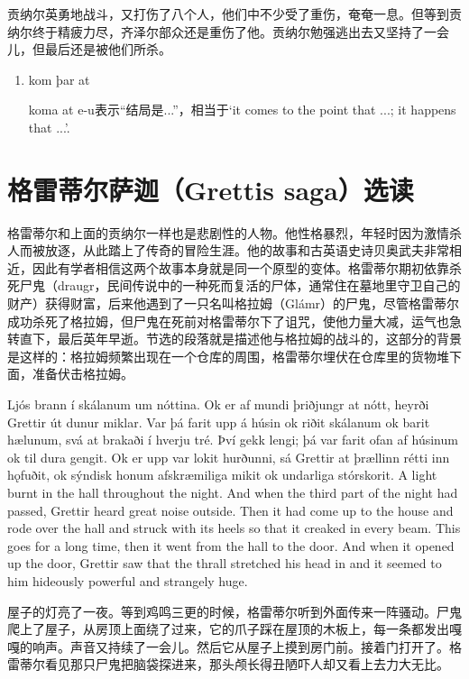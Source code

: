 \begin{translation*}{}
  贡纳尔英勇地战斗，又打伤了八个人，他们中不少受了重伤，奄奄一息。但等到贡纳尔终于精疲力尽，齐泽尔部众还是重伤了他。贡纳尔勉强逃出去又坚持了一会儿，但最后还是被他们所杀。
\end{translation*}
\begin{grammar*}{}
  \begin{enumerate}[leftmargin=*]
    \item kom þar at

          koma at e-u表示“结局是...”，相当于`it comes to the point that ...; it happens that ...'.
  \end{enumerate}
\end{grammar*}
\section{格雷蒂尔萨迦（Grettis saga）选读}
格雷蒂尔和上面的贡纳尔一样也是悲剧性的人物。他性格暴烈，年轻时因为激情杀人而被放逐，从此踏上了传奇的冒险生涯。他的故事和古英语史诗贝奥武夫非常相近，因此有学者相信这两个故事本身就是同一个原型的变体。格雷蒂尔期初依靠杀死尸鬼（draugr，民间传说中的一种死而复活的尸体，通常住在墓地里守卫自己的财产）获得财富，后来他遇到了一只名叫格拉姆（Glámr）的尸鬼，尽管格雷蒂尔成功杀死了格拉姆，但尸鬼在死前对格雷蒂尔下了诅咒，使他力量大减，运气也急转直下，最后英年早逝。节选的段落就是描述他与格拉姆的战斗的，这部分的背景是这样的：格拉姆频繁出现在一个仓库的周围，格雷蒂尔埋伏在仓库里的货物堆下面，准备伏击格拉姆。
\begin{paracol}{2}
  Ljós brann í skálanum um nóttina. Ok er af mundi þriðjungr at nótt, heyrði Grettir út dunur miklar. Var þá farit upp á húsin ok riðit skálanum ok barit hælunum, svá at brakaði í hverju tré. Því gekk lengi; þá var farit ofan af húsinum ok til dura gengit. Ok er upp var lokit hurðunni, sá Grettir at þrællinn rétti inn hǫfuðit, ok sýndisk honum afskræmiliga mikit ok undarliga stórskorit.
  \switchcolumn
  A light burnt in the hall throughout the night. And when the third part of the night had passed, Grettir heard great noise outside. Then it had come up to the house and rode over the hall and struck with its heels so that it creaked in every beam. This goes for a long time, then it went from the hall to the door. And when it opened up the door, Grettir saw that the thrall stretched his head in and it seemed to him hideously powerful and strangely huge.
\end{paracol}
\begin{translation*}{}
  屋子的灯亮了一夜。等到鸡鸣三更的时候，格雷蒂尔听到外面传来一阵骚动。尸鬼爬上了屋子，从房顶上面绕了过来，它的爪子踩在屋顶的木板上，每一条都发出嘎嘎的响声。声音又持续了一会儿。然后它从屋子上摸到房门前。接着门打开了。格雷蒂尔看见那只尸鬼把脑袋探进来，那头颅长得丑陋吓人却又看上去力大无比。
\end{translation*}
